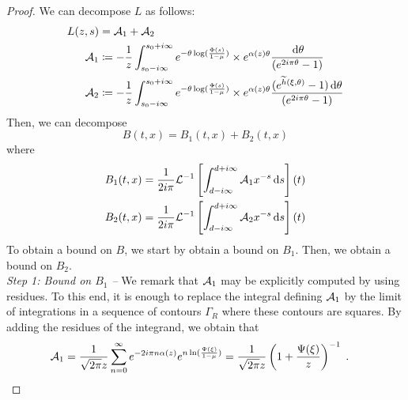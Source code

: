 \begin{proof}
We can decompose $L$ as follows:
\begin{align*}
    L(z, s) &= \mathcal{A}_1 + \mathcal{A}_2 \\
    \mathcal{A}_1 
    &\coloneqq    - \frac{1}{z}\int_{s_0-i\infty}^{s_0+i\infty} e^{-\theta\log(\frac{\Phi(s)}{1-\mu})} \times e^{ \alpha(z)\theta}
    \frac{\,\mathrm{d} \theta}{(e^{2i\pi\theta}-1)} \\ 
    \mathcal{A}_2 &\coloneqq 
    - \frac{1}{z}\int_{s_0-i\infty}^{s_0+i\infty} e^{-\theta\log(\frac{\Phi(s)}{1-\mu})} \times e^{ \alpha(z)\theta}
    \frac{(e^{\widetilde h(\xi, \theta)} - 1)\,\mathrm{d} \theta}{(e^{2i\pi\theta}-1)}
\end{align*}
Then, we can decompose 
\begin{equation*}
    B(t,x) = B_1(t,x) + B_2(t,x)
\end{equation*}
where
\begin{align*}
    B_1(t,x)
    &= 
    \frac{1}{2i\pi} \mathcal{L}^{-1}\left[\int_{d-i\infty}^{d+i\infty} \mathcal{A}_1 x^{-s}\,\mathrm{d} s \right] (t)   \\
    B_2(t,x)
    &= 
    \frac{1}{2i\pi} \mathcal{L}^{-1}\left[\int_{d-i\infty}^{d+i\infty} \mathcal{A}_2 x^{-s}\,\mathrm{d} s \right] (t)    
\end{align*}
To obtain a bound on $B$, we start by obtain a bound on $B_1$. Then, we obtain a bound on $B_2$.  \\

\textit{Step 1: Bound on $B_1$ --} We remark that $\mathcal{A}_1$ may be explicitly computed by using residues. To this end, it is enough to replace the integral defining $\mathcal{A}_1$ by the limit of integrations in a sequence of contours $\Gamma_R$ where these contours are squares. By adding the residues of the integrand, we obtain that 
    \begin{align*}
        \mathcal{A}_1 
        &= \frac{1}{\sqrt{2\pi}z} \sum_{n = 0}^{\infty} e^{-2i\pi n \alpha(z)} e^{n \ln(\frac{\Psi(\xi)}{1-\mu})} = \frac{1}{\sqrt{2\pi}z} \left( 1+   \frac{\Psi(\xi)}{z} \right)^{-1} \; .
    \end{align*}


\end{proof}
